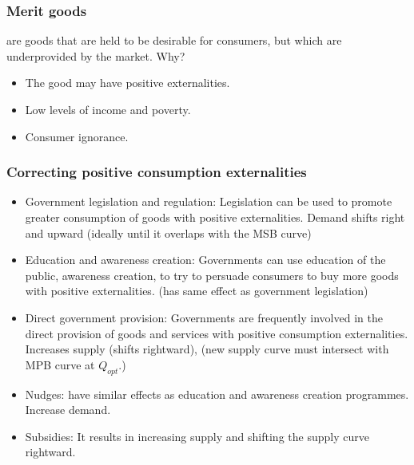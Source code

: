 \subsubsection*{Merit goods}
 are goods that are held to be desirable for consumers, but which are underprovided by the market. Why?
\begin{itemize}
  \item The good may have positive externalities.
  \item Low levels of income and poverty. 
  \item Consumer ignorance.
\end{itemize}
\subsubsection*{Correcting positive consumption externalities}
\begin{itemize}
  \item Government legislation and regulation: Legislation can be used to promote greater consumption of goods with positive externalities. Demand shifts right and upward (ideally until it overlaps with the MSB curve)
  \item Education and awareness creation: Governments can use education of the public, awareness creation, to try to persuade consumers to buy more goods with positive externalities. (has same effect as government legislation)
  \item Direct government provision: Governments are frequently involved in the direct provision of goods and services with positive consumption externalities. Increases supply (shifts rightward), (new supply curve must intersect with MPB curve at $Q_{opt}$.)
  \item Nudges: have similar effects as education and awareness creation programmes. Increase demand.
  \item Subsidies: It results in increasing supply and shifting the supply curve rightward.
\end{itemize}
